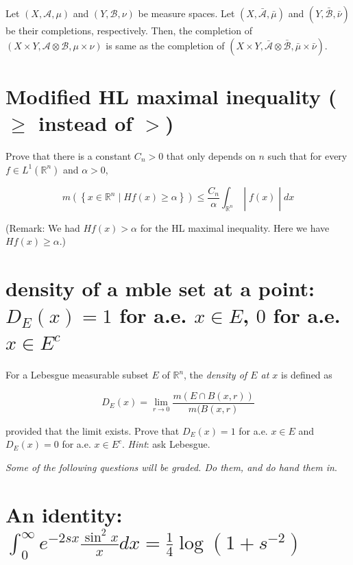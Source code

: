 \documentclass{qlnotes-export}
\begin{document}
Let \((X,\mathcal{A},\mu)\) and \((Y,\mathcal{B},\nu)\) be measure spaces. Let \((X,\bar{\mathcal{A}},\bar{\mu})\) and \((Y,\bar{\mathcal{B}},\bar{\nu})\) be their completions, respectively. Then, the completion of \((X \times Y,\mathcal{A} \otimes \mathcal{B},\mu \times \nu)\) is same as the completion of \((X \times Y,\bar{\mathcal{A}} \otimes \bar{\mathcal{B}},\bar{\mu} \times \bar{\nu})\).

\section{\texorpdfstring{Modified HL maximal inequality (\(\geq\) instead of \(>\))}{Modified HL maximal inequality (\textbackslash geq instead of \textgreater)}}\label{modified-hl-maximal-inequality-geq-instead-of}

Prove that there is a constant \(C_{n} > 0\) that only depends on \(n\) such that for every \(f \in L^{1}({\mathbb{R}}^{n})\) and \(\alpha > 0\),

\[\left. m(\left\{ {x \in {\mathbb{R}}^{n} \mid Hf(x) \geq \alpha} \right\}) \leq \frac{C_{n}}{\alpha}\int_{{\mathbb{R}}^{n}} \middle| f(x) \middle| dx \right.\]

(Remark: We had \(Hf(x) > \alpha\) for the HL maximal inequality. Here we have \(Hf(x) \geq \alpha\).)

\section{\texorpdfstring{density of a mble set at a point: \(D_{E}(x) = 1\) for a.e. \(x \in E\), \(0\) for a.e. \(x \in E^{c}\)}{density of a mble set at a point: D\_\{E\}(x) = 1 for a.e. x \textbackslash in E, 0 for a.e. x \textbackslash in E\^{}\{c\}}}

For a Lebesgue measurable subset \(E\) of \({\mathbb{R}}^{n}\), the \emph{density of \(E\) at \(x\)} is defined as

\[D_{E}(x) = \lim\limits_{r\rightarrow 0}\frac{m(E \cap B(x,r))}{m(B(x,r)}\]

provided that the limit exists. Prove that \(D_{E}(x) = 1\) for a.e. \(x \in E\) and \(D_{E}(x) = 0\) for a.e. \(x \in E^{c}\). \emph{Hint}: ask Lebesgue.

\emph{Some of the following questions will be graded. Do them, and do hand them in}.

\section{\texorpdfstring{An identity: \(\int_{0}^{\infty}e^{- 2sx}\frac{\sin^{2}x}{x} dx = \frac{1}{4}\log(1 + s^{- 2})\)}{An identity: \textbackslash int\_\{0\}\^{}\{\textbackslash infty\}e\^{}\{- 2sx\}\textbackslash frac\{\textbackslash sin\^{}\{2\}x\}\{x\} dx = \textbackslash frac\{1\}\{4\}\textbackslash log(1 + s\^{}\{- 2\})}}\label{an-identity-int_0infty-e-2sxfracsin2xxd-xfrac14log1s-2}
\end{document}
